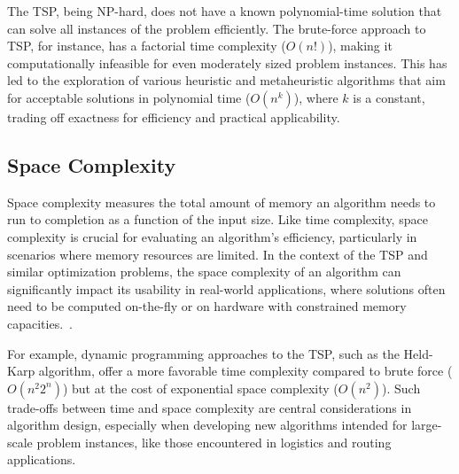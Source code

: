 The TSP, being NP-hard, does not have a known polynomial-time solution that can solve all instances of the problem efficiently. The brute-force approach to TSP, for instance, has a factorial time complexity (\(O(n!)\)), making it computationally infeasible for even moderately sized problem instances. This has led to the exploration of various heuristic and metaheuristic algorithms that aim for acceptable solutions in polynomial time (\(O(n^k)\)), where \(k\) is a constant, trading off exactness for efficiency and practical applicability.~\cite{Dorigo1996}
\begin{center}
\end{center}

\subsection{Space Complexity}

Space complexity measures the total amount of memory an algorithm needs to run to completion as a function of the input size. Like time complexity, space complexity is crucial for evaluating an algorithm's efficiency, particularly in scenarios where memory resources are limited. In the context of the TSP and similar optimization problems, the space complexity of an algorithm can significantly impact its usability in real-world applications, where solutions often need to be computed on-the-fly or on hardware with constrained memory capacities.~\cite{HeldKarp1962}.

For example, dynamic programming approaches to the TSP, such as the Held-Karp algorithm, offer a more favorable time complexity compared to brute force (\(O(n^2 2^n)\)) but at the cost of exponential space complexity (\(O(n^2)\)). Such trade-offs between time and space complexity are central considerations in algorithm design, especially when developing new algorithms intended for large-scale problem instances, like those encountered in logistics and routing applications.


